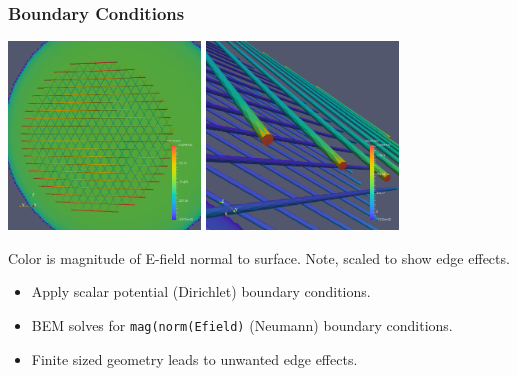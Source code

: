 \documentclass[xcolor=dvipsnames]{beamer}
\begin{document}
\begin{frame}
  \frametitle{Boundary Conditions}
  \begin{center}
    \includegraphics[height=5cm,clip,trim=0cm 0cm 0cm 0cm]{steps/drift-boundary1.png}%
    \includegraphics[height=5cm,clip,trim=0cm 0cm 00cm 0cm]{steps/drift-boundary2.png}

    \scriptsize Color is magnitude of E-field normal to surface.
    Note, scaled to show edge effects.
  \end{center}
  \begin{itemize}\footnotesize
  \item Apply scalar potential (Dirichlet) boundary conditions.
  \item BEM solves for \texttt{mag(norm(Efield)} (Neumann) boundary conditions.
  \item Finite sized geometry leads to unwanted edge effects.
  \end{itemize}
  
\end{frame}
\end{document}
